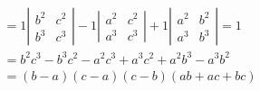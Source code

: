 \documentclass[a4paper, 12pt]{article}
\begin{document}
\begin{enumerate}
\begin{align*}
		&= 1 \left| \begin{array}{cc}
		b^2 & c^2 \\
		b^3 & c^3
		\end{array} \right|
		- 1 \left| \begin{array}{cc}
		a^2 & c^2 \\
		a^3 & c^3
		\end{array} \right|
		+ 1 \left| \begin{array}{cc}
		a^2 & b^2 \\
		a^3 & b^3
		\end{array} \right|
		= 1 \\
		&= b^2c^3 - b^3c^2 - a^2c^3 + a^3c^2 + a^2b^3 - a^3b^2 \\
		&= (b - a)(c - a)(c - b)(ab + ac + bc)
		\end{align*}
		

\end{enumerate}
\end{document}

